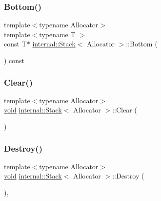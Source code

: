 \mbox{\label{classinternal_1_1Stack_af5c55983c553c7355ff6d24beb48c722}} 
\subsubsection{\texorpdfstring{Bottom()}{Bottom()}\hspace{0.1cm}{\footnotesize\ttfamily [2/2]}}
{\footnotesize\ttfamily template$<$typename Allocator$>$ \\
template$<$typename T $>$ \\
const T$\ast$ \hyperlink{classinternal_1_1Stack}{internal\+::\+Stack}$<$ Allocator $>$\+::Bottom (\begin{DoxyParamCaption}{ }\end{DoxyParamCaption}) const\hspace{0.3cm}{\ttfamily [inline]}}

\mbox{\label{classinternal_1_1Stack_a02da31665a372738e81ded2f7b7d598e}} 
\subsubsection{\texorpdfstring{Clear()}{Clear()}}
{\footnotesize\ttfamily template$<$typename Allocator$>$ \\
\hyperlink{imgui__impl__opengl3__loader_8h_ac668e7cffd9e2e9cfee428b9b2f34fa7}{void} \hyperlink{classinternal_1_1Stack}{internal\+::\+Stack}$<$ Allocator $>$\+::Clear (\begin{DoxyParamCaption}{ }\end{DoxyParamCaption})\hspace{0.3cm}{\ttfamily [inline]}}

\mbox{\label{classinternal_1_1Stack_a5efa6fdbfaf93c5e519a2e6f39bd081f}} 
\subsubsection{\texorpdfstring{Destroy()}{Destroy()}}
{\footnotesize\ttfamily template$<$typename Allocator$>$ \\
\hyperlink{imgui__impl__opengl3__loader_8h_ac668e7cffd9e2e9cfee428b9b2f34fa7}{void} \hyperlink{classinternal_1_1Stack}{internal\+::\+Stack}$<$ Allocator $>$\+::Destroy (\begin{DoxyParamCaption}{ }\end{DoxyParamCaption})\hspace{0.3cm}{\ttfamily [inline]}, {\ttfamily [private]}}

